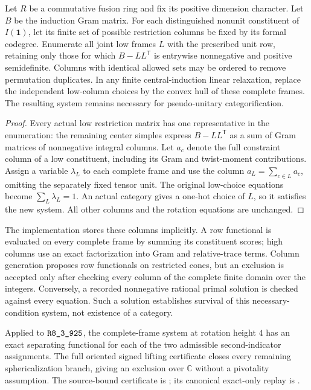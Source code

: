 \begin{proposition}
Let $R$ be a commutative fusion ring and fix its positive dimension
character. Let $B$ be the induction Gram matrix. For each distinguished
nonunit constituent of $I(\mathbf1)$, let its finite set of possible
restriction columns be fixed by its formal codegree. Enumerate all joint
low frames $L$ with the prescribed unit row, retaining only those for
which $B-LL^{\mathsf T}$ is entrywise nonnegative and positive
semidefinite. Columns with identical allowed sets may be ordered to
remove permutation duplicates. In any finite central-induction linear
relaxation, replace the independent low-column choices by the convex
hull of these complete frames. The resulting system remains necessary
for pseudo-unitary categorification.
\end{proposition}
\begin{proof}
Every actual low restriction matrix has one representative in the
enumeration: the remaining center simples express $B-LL^{\mathsf T}$
as a sum of Gram matrices of nonnegative integral columns. Let $a_c$
denote the full constraint column of a low constituent, including its
Gram and twist-moment contributions. Assign a variable $\lambda_L$ to
each complete frame and use the column $a_L=\sum_{c\in L}a_c$, omitting
the separately fixed tensor unit. The original low-choice equations
become $\sum_L\lambda_L=1$. An actual category gives a one-hot choice
of $L$, so it satisfies the new system. All other columns and the
rotation equations are unchanged.
\end{proof}

The implementation stores these columns implicitly. A row functional
is evaluated on every complete frame by summing its constituent scores;
high columns use an exact factorization into Gram and relative-trace
terms. Column generation proposes row functionals on restricted cones,
but an exclusion is accepted only after checking every column of the
complete finite domain over the integers. Conversely, a recorded
nonnegative rational primal solution is checked against every equation.
Such a solution establishes survival of this necessary-condition
system, not existence of a category.

Applied to $\sha{R8_3_925}$, the complete-frame system at rotation height
$4$ has an exact separating functional for each of the two admissible
second-indicator assignments. The full oriented signed lifting
certificate closes every remaining sphericalization branch, giving an
exclusion over $\mathbb C$ without a pivotality assumption. The
source-bound certificate is
; its
canonical exact-only replay is
.


